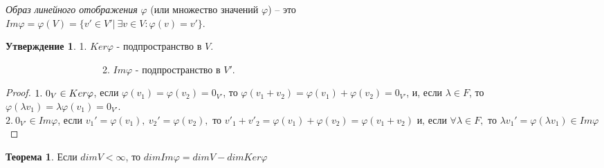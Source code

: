 \documentclass[a4paper, 12pt]{article}
\theoremstyle{definition}
\newtheorem*{theorem}{Теорема}
\newtheorem*{subtheorem}{Утверждение}
\begin{document}
    \textit{Образ линейного отображения} $\varphi$ (или множество
    значений $\varphi$) -- это\\ $Im\varphi =\varphi(V) = 
    \{v' \in V'|\ \exists v \in V: \varphi(v) = v'\}.$

    \begin{subtheorem}
        1. $Ker\varphi$ - подпространство в $V$.

        \ \ \ \ \ \ \ \ \ \ \ \ \ \ \ \ \ \ \ \ 
        2. $Im\varphi$ - подпространство в $V'$.
    \end{subtheorem}
    \begin{proof}
        $\\1.\ 0_V \in Ker\varphi$, если $\varphi(v_1) =
        \varphi(v_2) = 0_{V'}$, то $\varphi(v_1 + v_2) = 
        \varphi(v_1) + \varphi(v_2) = 0_{V'}$, и, если $\lambda
        \in F$, то $\varphi(\lambda v_1) = \lambda \varphi(v_1)
        = 0_{V'}.$\\
        $2.\ 0_{V'} \in Im\varphi$, если $v_1' = \varphi(v_1),\
        v_2' = \varphi(v_2), \text{ то } v'_1 + v'_2 =
        \varphi(v_1) + \varphi(v_2) = \varphi(v_1 + v_2)
        \text{ и, если }
        \forall \lambda
        \in F,\text{ то } \lambda v_1' = \varphi(\lambda v_1) \in Im\varphi$

    \end{proof}
    \begin{theorem}
        Если $dimV < \infty$, то $dimIm\varphi = dimV - dimKer
        \varphi$
    \end{theorem}
\end{document}
